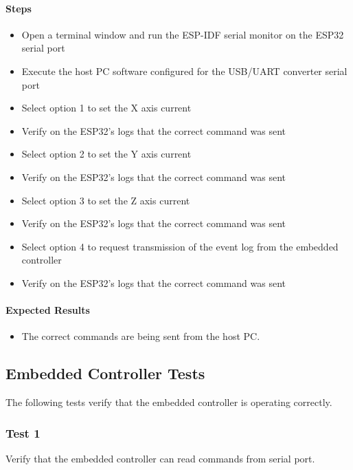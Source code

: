 \documentclass[10pt,twocolumn,letterpaper]{article}
\begin{document}
\paragraph{Steps}
\begin{itemize}
  \item Open a terminal window and run the ESP-IDF serial monitor on the ESP32 serial port
  \item Execute the host PC software configured for the USB/UART converter serial port
  \item Select option 1 to set the X axis current
  \item Verify on the ESP32's logs that the correct command was sent
  \item Select option 2 to set the Y axis current
  \item Verify on the ESP32's logs that the correct command was sent
  \item Select option 3 to set the Z axis current
  \item Verify on the ESP32's logs that the correct command was sent
  \item Select option 4 to request transmission of the event log from the embedded controller
  \item Verify on the ESP32's logs that the correct command was sent
\end{itemize}

\paragraph{Expected Results}

\begin{itemize}
  \item The correct commands are being sent from the host PC.
\end{itemize}

\subsection{Embedded Controller Tests}

The following tests verify that the embedded controller is operating correctly.

\subsubsection{Test 1}

Verify that the embedded controller can read commands from serial port.
\end{document}
